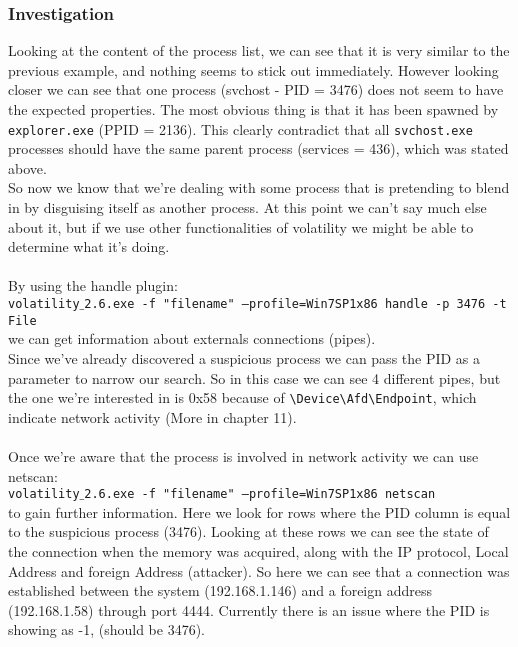 \documentclass[a4paper]{article}
\begin{document}
\subsubsection{Investigation} %
Looking at the content of the process list, we can see that it is very similar to the previous example,
and nothing seems to stick out immediately. However looking closer we can see that one process
(svchost - PID = 3476) does not seem to have the expected properties. The most obvious thing is that
it has been spawned by \texttt{explorer.exe} (PPID = 2136). This clearly contradict that all
\texttt{svchost.exe} processes should have the same parent process (services = 436), which was stated
above. \\
So now we know that we're dealing with some process that is pretending to blend in by disguising
itself as another process. At this point we can't say much else about it, but if we use other
functionalities of volatility we might be able to determine what it's doing. \\ \\
By using the handle plugin: \\
\texttt{volatility$\_$2.6.exe -f "filename" --profile=Win7SP1x86 handle -p 3476 -t File} \\
we can get information about externals connections (pipes). \\
Since we've already discovered a suspicious process we can pass the PID as a parameter to narrow
our search. So in this case we can see 4 different pipes, but the one we're interested in is 0x58
because of \texttt{\textbackslash Device\textbackslash Afd\textbackslash Endpoint}, which indicate network activity (More in chapter 11). \\\\
Once we're aware that the process is involved in network activity we can use netscan: \\
\texttt{volatility$\_$2.6.exe -f "filename" --profile=Win7SP1x86 netscan} \\
to gain further information. Here we look for rows where the PID column is equal to the suspicious
process (3476). Looking at these rows we can see the state of the connection when the memory
was acquired, along with the IP protocol, Local Address and foreign Address (attacker).
So here we can see that a connection was established between the system (192.168.1.146) and a foreign address (192.168.1.58) through port 4444.
Currently there is an issue where the PID is showing as -1, (should be 3476). \\\\
%
\end{document}
